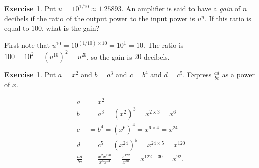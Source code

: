 \documentclass[a4paper]{book}
\newcommand{\PURPLE}[1]{{\color{purple}#1}}
\newcommand{\tm}        {\times}
\renewcommand{\:}{\colon}
\newcommand{\DEFN}[1]{\PURPLE{\emph{#1}}}
\theoremstyle{definition}
\newtheorem{exercise}[theorem]{Exercise}
\renewenvironment{solution}{\SolutionInline}{\endSolutionInline}
\begin{document}
\begin{exercise}
 Put $u=10^{1/10}\approx 1.25893$.  An amplifier is said to have a
 \DEFN{gain} of $n$ decibels if the ratio of the output power to the
 input power is $u^n$.  If this ratio is equal to $100$, what is the
 gain? 
\end{exercise}
\begin{solution}
 First note that $u^{10}=10^{(1/10)\tm 10}=10^1=10$.  The ratio is
 $100=10^2=(u^{10})^2=u^{20}$, so the gain is $20$ decibels.
\end{solution}
\begin{exercise}
 Put $a=x^2$ and $b=a^3$ and $c=b^4$ and $d=c^5$.  Express
 $\frac{ad}{bc}$ as a power of $x$.
\end{exercise}
\begin{solution}
 \begin{align*}
  a &= x^2 \\
  b &= a^3 = (x^2)^3 = x^{2\tm 3} = x^6 \\
  c &= b^4 = (x^6)^4 = x^{6\tm 4} = x^{24} \\
  d &= c^5 = (x^{24})^5 = x^{24\tm 5} = x^{120} \\
  \frac{ad}{bc} &= \frac{x^2 x^{120}}{x^6 x^{24}}
                 = \frac{x^{122}}{x^{30}} = x^{122-30} = x^{92}.
 \end{align*}
\end{solution}
\end{document}
